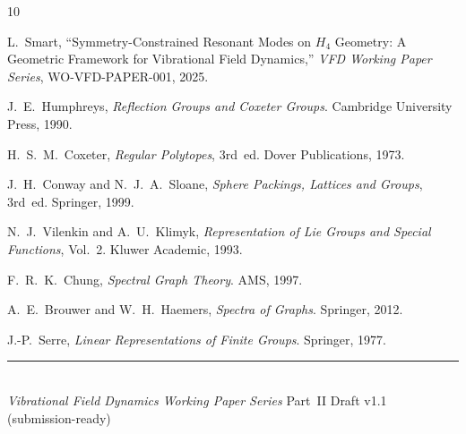 \documentclass[12pt,a4paper]{article}
\begin{document}
\begin{thebibliography}{10}

L.~Smart,
``Symmetry-Constrained Resonant Modes on $H_4$ Geometry:
A Geometric Framework for Vibrational Field Dynamics,''
\textit{VFD Working Paper Series}, WO-VFD-PAPER-001, 2025.

J.~E.~Humphreys,
\textit{Reflection Groups and Coxeter Groups}.
Cambridge University Press, 1990.

H.~S.~M.~Coxeter,
\textit{Regular Polytopes}, 3rd~ed.
Dover Publications, 1973.

J.~H.~Conway and N.~J.~A.~Sloane,
\textit{Sphere Packings, Lattices and Groups}, 3rd~ed.
Springer, 1999.

N.~J.~Vilenkin and A.~U.~Klimyk,
\textit{Representation of Lie Groups and Special Functions}, Vol.~2.
Kluwer Academic, 1993.

F.~R.~K.~Chung,
\textit{Spectral Graph Theory}.
AMS, 1997.

A.~E.~Brouwer and W.~H.~Haemers,
\textit{Spectra of Graphs}.
Springer, 2012.

J.-P.~Serre,
\textit{Linear Representations of Finite Groups}.
Springer, 1977.

\end{thebibliography}

\vfill
\noindent\rule{\textwidth}{0.4pt}\\[4pt]
{\footnotesize
\textit{Vibrational Field Dynamics Working Paper Series}
\hfill Part~II \quad Draft v1.1 (submission-ready)}
\end{document}
